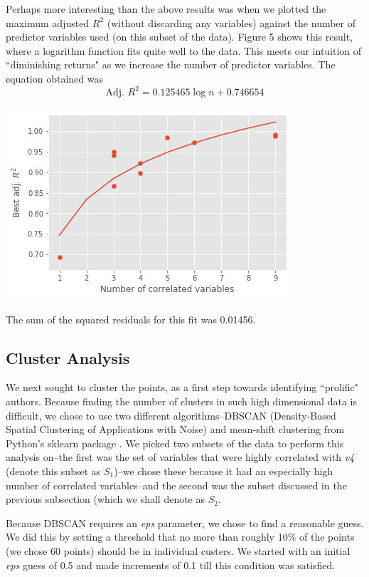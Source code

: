 \documentclass[12pt,a4paper,twocolumn]{article}
\begin{document}
Perhaps more interesting than the above results was when we plotted the maximum adjusted $R^2$ (without discarding any variables) against the number of predictor variables used (on this subset of the data). Figure 5 shows this result, where a logarithm function fits quite well to the data. This meets our intuition of ``diminishing returns" as we increase the number of predictor variables. The equation obtained was
\begin{equation}
	\text{Adj. } R^2 = 0.125465 \log n + 0.746654
\end{equation}

\includegraphics[scale=0.5]{fig5.png}
\begingroup
{}
\endgroup
\hfill\break

The sum of the squared residuals for this fit was 0.01456.

\subsection{Cluster Analysis}
We next sought to cluster the points, as a first step towards identifying ``prolific" authors. Because finding the number of clusters in such high dimensional data is difficult, we chose to use two different algorithms--DBSCAN (Density-Based Spatial Clustering of Applications with Noise)\cite{ester1996density} and mean-shift clustering \cite{comaniciu2002mean} from Python's sklearn package \cite{scikit-learn}. We picked two subsets of the data to perform this analysis on--the first was the set of variables that were highly correlated with \textit{v4} (denote this subset as $S_1$)--we chose these because it had an especially high number of correlated variables--and the second was the subset discussed in the previous subsection (which we shall denote as $S_2$.

Because DBSCAN requires an \textit{eps} parameter, we chose to find a reasonable guess. We did this by setting a threshold that no more than roughly 10\% of the points (we chose 60 points) should be in individual custers. We started with an initial \textit{eps} guess of 0.5 and made increments of 0.1 till this condition was satisfied.
\end{document}
